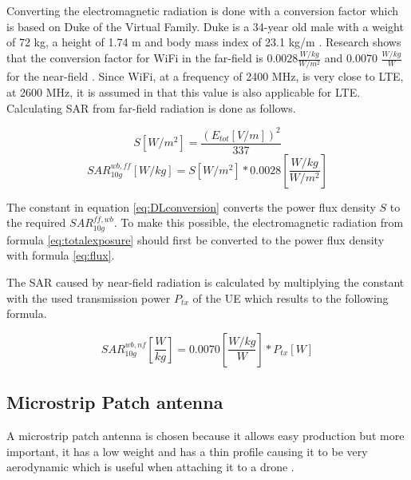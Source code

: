 \documentclass[twocolumn]{phdsymp} %
\begin{document}
Converting the electromagnetic radiation is done with a conversion factor which is based 
on Duke of the Virtual Family. Duke is a 34-year old male with a weight of 72 kg, a height of 1.74 m and body
mass index of 23.1 kg/m \cite{J22_plets2015joint}. 
Research shows that the conversion factor for WiFi in the far-field is $0.0028 \frac{W/kg}{W/m^2}$
and 0.0070 $\frac{W/kg}{W}$ for the near-field \cite{J22_plets2015joint}.
Since WiFi, at a frequency of 2400 MHz,
is very close to \gls{LTE}, at 2600 MHz, it is assumed in \cite{J22_plets2015joint} that this value is also applicable for \gls{LTE}.
Calculating \gls{SAR} from far-field radiation is done as follows.

\begin{equation}
S [W/m^2]= \frac{(E_{tot} [V/m])^2}{337}
\label{eq:flux}
\end{equation}
\begin{equation}
SAR^{wb,ff}_{10g} [W/kg]= S [W/m^2]* 0.0028 \left[\frac{W/kg}{W/m^2}\right]
\label{eq:DLconversion}
\end{equation}

The constant in equation \ref{eq:DLconversion} converts the \gls{power flux density} $S$ to the required $SAR^{ff,wb}_{10g}$.
To make this possible, the electromagnetic radiation
from formula \ref{eq:totalexposure} should first be converted to the  \gls{power flux density} with formula 
\ref{eq:flux}.

The SAR caused by near-field radiation is calculated by multiplying the constant with the used transmission
power $P_{tx}$ of the \gls{UE} which results to the following formula.

\begin{equation} 
SAR^{wb,nf}_{10g} \left[\frac{W}{kg}\right] = 0.0070 \left[\frac{W/kg}{W}\right] * P_{tx} [W]
\label{eq:ulToSar}
\end{equation}

\subsection{Microstrip Patch antenna}
A microstrip patch antenna is chosen because it allows easy production but more important, it has a low weight 
and has a thin profile causing it to be very aerodynamic which is useful when attaching it to a drone \cite{J13_microstripadvantages}.
\end{document}
